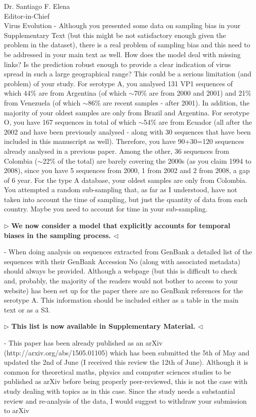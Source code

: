 \documentclass[12pt, a4paper]{letter} %
\newenvironment{reply}{$\triangleright$\bf}{$\triangleleft$}
\begin{document}
\begin{letter}{
	Dr. Santiago F. Elena\\
    Editor-in-Chief \\
    Virus Evolution
}
-       Although you presented some data on sampling bias in your Supplementary Text (but this might be not satisfactory enough given the problem in the dataset), there is a real problem of sampling bias and this need to be addressed in your main text as well. 
How does the model deal with missing links? 
Is the prediction robust enough to provide a clear indication of virus spread in such a large geographical range? 
This could be a serious limitation (and problem) of your study. For serotype A, you analysed 131 VP1 sequences of which 44\% are from Argentina (of which $\sim$70\% are from 2000 and 2001) and 21\% from Venezuela (of which $\sim$86\% are recent samples - after 2001). 
In addition, the majority of your oldest samples are only from Brazil and Argentina. For serotype O, you have 167 sequences in total of which $\sim$54\% are from Ecuador (all after the 2002 and have been previously analysed - along with 30 sequences that have been included in this manuscript as well). 
Therefore, you have 90+30=120 sequences already analysed in a previous paper. 
Among the other, 36 sequences from Colombia ($\sim$22\% of the total) are barely covering the 2000s (as you claim 1994 to 2008), since you have 5 sequences from 2000, 1 from 2002 and 2 from 2008, a gap of 6 year. 
For the type A database, your oldest samples are only from Colombia. You attempted a random sub-sampling that, as far as I understood, have not taken into account the time of sampling, but just the quantity of data from each country. 
Maybe you need to account for time in your sub-sampling.

\begin{reply}
We now consider a model that explicitly accounts for temporal biases in the sampling process. 
\end{reply}

-       When doing analysis on sequences extracted from GenBank a detailed list of the sequences with their GenBank Accession No (along with associated metadata) should always be provided. 
Although a webpage (but this is difficult to check and, probably, the majority of the readers would not bother to access to your website) has been set up for the paper there are no GenBank references for the serotype A. 
This information should be included either as a table in the main text or as a S3.

\begin{reply}
This list is now available in Supplementary Material.
\end{reply}

-       This paper has been already published as an arXiv (http://arxiv.org/abs/1505.01105) which has been submitted the 5th of May and updated the 2nd of June (I received this review the 12th of June). 
Although it is common for theoretical maths, physics and computer sciences studies to be published as arXiv before being properly peer-reviewed, this is not the case with study dealing with topics as in this case. 
Since the study needs a substantial review and re-analysis of the data, I would suggest to withdraw your submission to arXiv


\end{letter}
\end{document}
